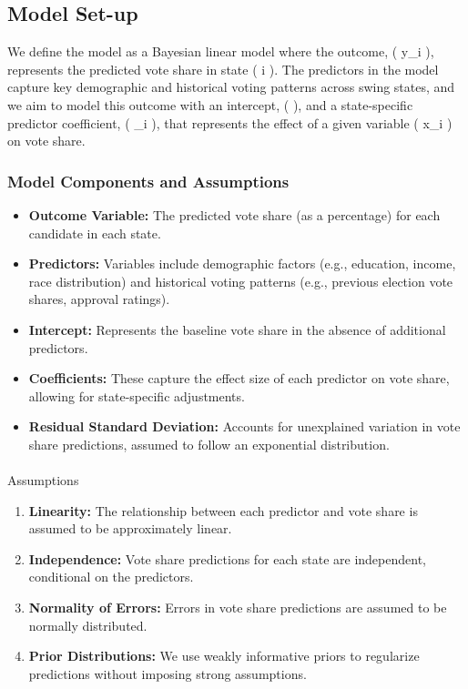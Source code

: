 \documentclass[
  letterpaper,
  DIV=11,
  numbers=noendperiod]{scrartcl}
\makeatletter
\let\oldparagraph\paragraph
\renewcommand{\paragraph}{
    \@ifstar
      \xxxParagraphStar
      \xxxParagraphNoStar
  }
\newcommand{\xxxParagraphStar}[1]{\oldparagraph*{#1}\mbox{}}
\newcommand{\xxxParagraphNoStar}[1]{\oldparagraph{#1}\mbox{}}
\providecommand{\tightlist}{%
  \setlength{\itemsep}{0pt}\setlength{\parskip}{0pt}}\usepackage{longtable,booktabs,array}
\makeatother
\begin{document}
\subsection{Model Set-up}\label{model-set-up}

We define the model as a Bayesian linear model where the outcome, ( y\_i
), represents the predicted vote share in state ( i ). The predictors in
the model capture key demographic and historical voting patterns across
swing states, and we aim to model this outcome with an intercept, (
\alpha ), and a state-specific predictor coefficient, ( \beta\_i ), that
represents the effect of a given variable ( x\_i ) on vote share.

\subsubsection{Model Components and
Assumptions}\label{model-components-and-assumptions}

\begin{itemize}
\tightlist
\item
  \textbf{Outcome Variable:} The predicted vote share (as a percentage)
  for each candidate in each state.
\item
  \textbf{Predictors:} Variables include demographic factors (e.g.,
  education, income, race distribution) and historical voting patterns
  (e.g., previous election vote shares, approval ratings).
\item
  \textbf{Intercept:} Represents the baseline vote share in the absence
  of additional predictors.
\item
  \textbf{Coefficients:} These capture the effect size of each predictor
  on vote share, allowing for state-specific adjustments.
\item
  \textbf{Residual Standard Deviation:} Accounts for unexplained
  variation in vote share predictions, assumed to follow an exponential
  distribution.
\end{itemize}

\paragraph{Assumptions}\label{assumptions}

\begin{enumerate}
\def\labelenumi{\arabic{enumi}.}
\tightlist
\item
  \textbf{Linearity:} The relationship between each predictor and vote
  share is assumed to be approximately linear.
\item
  \textbf{Independence:} Vote share predictions for each state are
  independent, conditional on the predictors.
\item
  \textbf{Normality of Errors:} Errors in vote share predictions are
  assumed to be normally distributed.
\item
  \textbf{Prior Distributions:} We use weakly informative priors to
  regularize predictions without imposing strong assumptions.
\end{enumerate}
\end{document}
